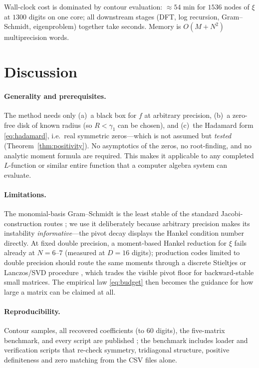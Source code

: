 \documentclass[11pt]{article}
\theoremstyle{definition}
\begin{document}
Wall-clock cost is dominated by contour evaluation: $\approx 54$ min
for $1536$ nodes of $\xi$ at $1300$ digits on one core; all
downstream stages (DFT, log recursion, Gram--Schmidt, eigenproblem)
together take seconds. Memory is $O(M+N^2)$ multiprecision words.

\section{Discussion}

\paragraph{Generality and prerequisites.}
The method needs only (a)~a black box for $f$ at arbitrary precision,
(b)~a zero-free disk of known radius (so $R<\gamma_1$ can be chosen),
and (c)~the Hadamard form \eqref{eq:hadamard}, i.e.\ real symmetric
zeros---which is not assumed but \emph{tested}
(Theorem~\ref{thm:positivity}). No asymptotics of the zeros, no
root-finding, and no analytic moment formula are required. This makes
it applicable to any completed $L$-function or similar entire function
that a computer algebra system can evaluate.

\paragraph{Limitations.}
The monomial-basis Gram--Schmidt is the least stable of the standard
Jacobi-construction routes \cite{Gautschi2004,Bjorck1994}; we use it
deliberately because arbitrary precision makes its instability
\emph{informative}---the pivot decay displays the Hankel condition
number directly. At fixed double precision, a moment-based Hankel
reduction for $\xi$ fails already at $N=6$--$7$ (measured at
$D=16$ digits); production codes
limited to double precision should route the same moments through a
discrete Stieltjes or Lanczos/SVD procedure \cite{Gautschi2004},
which trades the visible pivot floor for backward-stable small
matrices. The empirical law \eqref{eq:budget} then becomes the
guidance for how large a matrix can be claimed at all.

\paragraph{Reproducibility.}
Contour samples, all recovered coefficients (to $60$ digits), the
five-matrix benchmark, and every script are published
\cite{zenodo2026}; the benchmark includes loader and verification
scripts that re-check symmetry, tridiagonal structure, positive
definiteness and zero matching from the CSV files alone.
\end{document}
